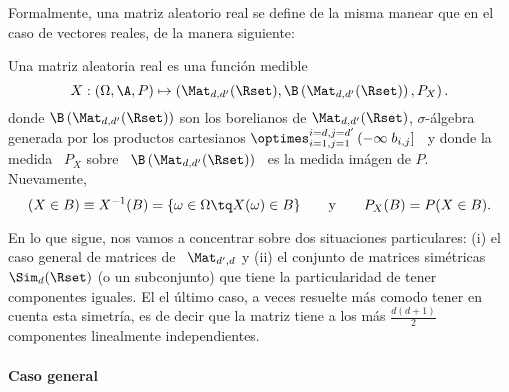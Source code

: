Formalmente, una  matriz aleatorio real se define  de la misma manear  que en el
caso de vectores reales, de la manera siguiente:
%
\begin{definicion}
\label{Def:MP:MatrizAleatorioaReal}
%
  Una matriz aleatoria real es una funci\'on medible
  \[
  X:  (\Omega,\A,P) \mapsto  \left( \Mat_{d,d'}(\Rset)  ,  \B\left( \Mat_{d,d'}(\Rset)
    \right) , P_X \right).
  \]
  donde   $\B\left(    \Mat_{d,d'}(\Rset)   \right)$   son    los   borelianos   de
  $\Mat_{d,d'}(\Rset)$, $\sigma$-\'algebra  generada por los  productos cartesianos
  $\optimes_{i=1,j=1}^{i=d,j=d'}  \left( -\infty \;  b_{i,j} \right]$  \ y
  donde la  medida \ $P_X$  sobre \ $\B\left(  \Mat_{d,d'}(\Rset) \right)$ \  es la
  medida im\'agen de $P$. Nuevamente,
  \[
  (X \in  B) \equiv  X^{-1}(B) =  \{ \omega \in  \Omega \tq  X(\omega) \in  B \}
  \qquad \mbox{y} \qquad P_X(B) = P(X \in B).
  \]
\end{definicion}

En lo que sigue, nos vamos  a concentrar sobre dos situaciones particulares: (i)
el caso  general de matrices de \  $\Mat_{d',d}$ y (ii) el  conjunto de matrices
sim\'etricas $\Sim_d(\Rset)$  (o un subconjunto) que tiene  la particularidad de
tener componentes  iguales. El el \'ultimo  caso, a veces  resuelte m\'as comodo
tener en  cuenta esta simetr\'ia, es  de decir que  la matriz tiene a  los m\'as
$\frac{d (d+1)}{2}$ componentes linealmente independientes.




\paragraph{Caso general}


